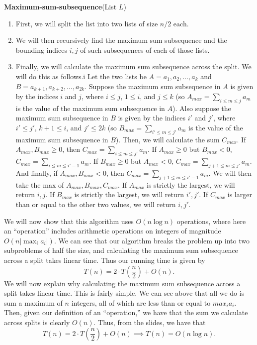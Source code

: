 \documentclass{article}
\begin{document}
\vspace{5mm}
\textbf{Maximum-sum-subsequence}(List $L$)
\begin{enumerate}
    \item First, we will split the list into two lists of size $n/2$ each.
    \item We will then recursively find the maximum sum subsequence and the
        bounding indices $i,j$ of such subsequences of each of those lists.
    \item Finally, we will calculate the maximum sum subsequence across the
        split. We will do this as follows.i Let the two lists be $A = a_1, a_2,
        \dots, a_k$ and $B = a_{k+1}, a_{k+2}, \dots, a_{2k}$. Suppose the
        maximum sum subsequence in $A$ is given by the indices $i$ and $j$,
        where $i \leq j$, $1 \leq i$, and $j \leq k$ (so $A_{max} = \sum_{i \leq m \leq j}
        a_m$ is the value of the maximum sum subsequence in $A$). Also suppose the
        maximum sum subsequence in $B$ is given by the indices $i'$ and $j'$,
        where $i' \leq j'$, $k+1 \leq i$, and $j' \leq 2k$ (so $B_{max} =
        \sum_{i' \leq m \leq j'} a_m$ is the value of the maximum sum subsequence in $B$).
        Then, we will calculate the sum $C_{max}$. If $A_{max}, B_{max} \geq 0$,
        then $C_{max} = \sum_{i \leq m \leq j'} a_m$. If $A_{max} \geq 0$ but
        $B_{max} < 0$, $C_{max} = \sum_{i \leq m \leq i'-1} a_m$.
        If $B_{max} \geq 0$ but
        $A_{max} < 0$, $C_{max} = \sum_{j+1 \leq m \leq j'} a_m$. And finally,
        if $A_{max}, B_{max} < 0$,
        then $C_{max} = \sum_{j+1 \leq m \leq i'-1} a_m$.
        We will then take the max of $A_{max}, B_{max}, C_{max}$. If $A_{max}$
        is strictly the largest, we will return $i,j$. If $B_{max}$ is strictly
        the largest, we will return $i',j'$. If $C_{max}$ is larger than or
        equal to the other two values, we will return $i,j'$.
\end{enumerate}

\vspace{5mm}
We will now show that this algorithm uses $O(n\log n)$ operations, where here
an ``operation'' includes arithmetic operations on integers of magnitude $O(n|\max_i a_i|)$.
We can see that our algorithm breaks the problem up into two subproblems of half
the size, and calculating the maximum sum subsequence across a split takes linear
time. Thus our running time is given by
\[ T(n) = 2 \cdot T(\frac{n}{2}) + O(n). \]
We will now explain why calculating the maximum sum subsequence across a split
takes linear time. This is fairly simple. We can see above that all we do is sum
a maximum of $n$ integers, all of which are less than or equal to $max_i a_i$.
Then, given our definition of an ``operation,'' we have that the sum we
calculate across splits is clearly $O(n)$. Thus, from the slides, we have that
\[ T(n) = 2 \cdot T(\frac{n}{2}) + O(n) \implies T(n) = O(n \log n). \]
\end{document}
